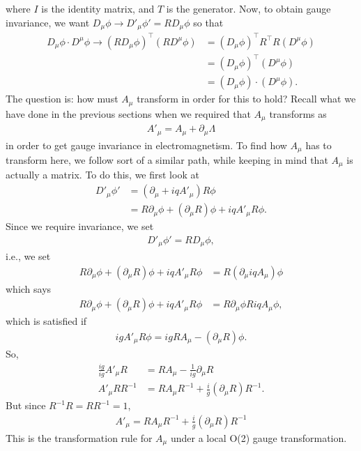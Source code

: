 \documentclass[a4paper,11pt]{article}
\numberwithin{equation}{section}
\theoremstyle{definition}
\newcommand{\p}{\partial}
\begin{document}
where $I$ is the identity matrix, and $T$ is the generator. Now, to obtain gauge invariance, we want $D_\mu\phi \to D'_\mu\phi' = RD_\mu\phi$ so that
\begin{align}
D_\mu\phi \cdot D^\mu\phi \to \left(RD_\mu\phi\right)^\top \left(RD^\mu\phi\right) &=  (D_\mu\phi)^\top R^\top R (D^\mu\phi)\\
&= (D_\mu\phi)^\top(D^\mu\phi)\\
&= (D_\mu\phi)\cdot(D^\mu\phi).
\end{align}
The question is: how must $A_\mu$ transform in order for this to hold? Recall what we have done in the previous sections when we required that $A_\mu$ transforms as
\begin{align}
A'_\mu = A_\mu + \p_\mu\Lambda
\end{align}
in order to get gauge invariance in electromagnetism. To find how $A_\mu$ has to transform here, we follow sort of a similar path, while keeping in mind that $A_\mu$ is actually a matrix. To do this, we first look at
\begin{align}
D'_\mu\phi' &= (\p_\mu + iqA'_\mu)R\phi\\
&= R\p_\mu\phi + (\p_\mu R)\phi + iqA'_\mu R\phi.
\end{align}
Since we require invariance, we set
\begin{align}
D'_\mu\phi' = RD_\mu\phi,
\end{align}
i.e., we set
\begin{align}
R\p_\mu\phi + (\p_\mu R)\phi + iqA'_\mu R\phi &= R(\p_\mu iqA_\mu)\phi 
\end{align}
which says
\begin{align}
R\p_\mu\phi + (\p_\mu R)\phi + iqA'_\mu R\phi &= R\p_\mu\phi  RiqA_\mu\phi,
\end{align}
which is satisfied if
\begin{align}
igA'_\mu R\phi = igRA_\mu - (\p_\mu R)\phi.
\end{align}
So,
\begin{align}
\frac{ig}{ig}A'_\mu R &= RA_\mu - \frac{1}{ig}\p_\mu R\\
A'_\mu RR^{-1} &= RA_\mu R^{-1} + \frac{i}{g}(\p_\mu R)R^{-1}.
\end{align}
But since $R^{-1}R = RR^{-1} = 1$,
\begin{align}
\boxed{A'_\mu = RA_\mu R^{-1} + \frac{i}{g}(\p_\mu R)R^{-1}}
\end{align}
This is the transformation rule for $A_\mu$ under a local O(2) gauge transformation.\\
\end{document}
